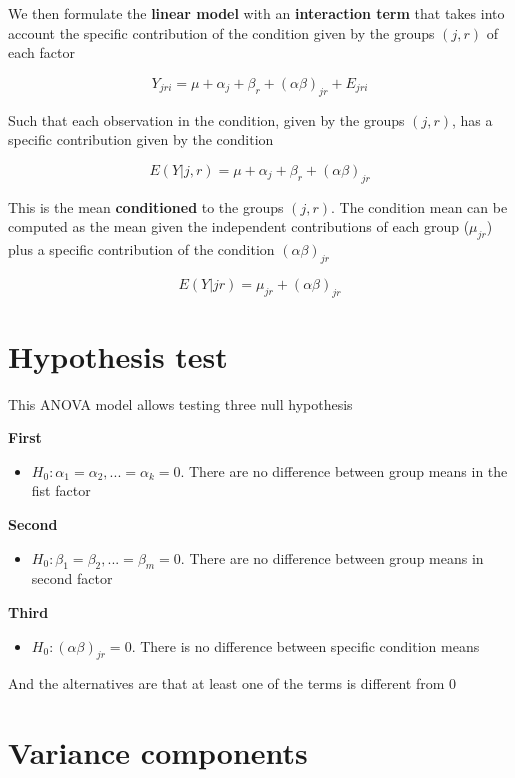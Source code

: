 \documentclass[
]{book}
\providecommand{\tightlist}{%
  \setlength{\itemsep}{0pt}\setlength{\parskip}{0pt}}
\begin{document}
We then formulate the \textbf{linear model} with an \textbf{interaction term} that takes into account the specific contribution of the condition given by the groups \((j,r)\) of each factor

\[Y_{jri} = \mu + \alpha_j + \beta_r + (\alpha\beta)_{jr} + E_{jri}\]

Such that each observation in the condition, given by the groups \((j,r)\), has a specific contribution given by the condition

\[E(Y|j,r)=\mu + \alpha_j+ \beta_r + (\alpha\beta)_{jr}\]

This is the mean \textbf{conditioned} to the groups \((j,r)\). The condition mean can be computed as the mean given the independent contributions of each group (\(\mu_{jr}\)) plus a specific contribution of the condition \((\alpha\beta)_{jr}\)

\[E(Y|jr)=\mu_{jr}  + (\alpha\beta)_{jr}\]

\hypertarget{hypothesis-test-4}{%
\section{Hypothesis test}\label{hypothesis-test-4}}

This ANOVA model allows testing three null hypothesis

\textbf{First}

\begin{itemize}
\tightlist
\item
  \(H_0: \alpha_1=\alpha_2, ...=\alpha_k=0\). There are no difference between group means in the fist factor
\end{itemize}

\textbf{Second}

\begin{itemize}
\tightlist
\item
  \(H_0: \beta_1=\beta_2, ...=\beta_m=0\). There are no difference between group means in second factor
\end{itemize}

\textbf{Third}

\begin{itemize}
\tightlist
\item
  \(H_0: (\alpha\beta)_{jr}=0\). There is no difference between specific condition means
\end{itemize}

And the alternatives are that at least one of the terms is different from \(0\)

\hypertarget{variance-components-1}{%
\section{Variance components}\label{variance-components-1}}
\end{document}
